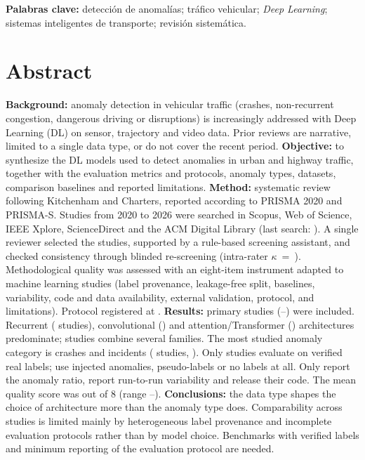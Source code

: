 \documentclass[12pt, a4paper]{article}
\begin{document}
\noindent\textbf{Palabras clave:} detecci\'{o}n de anomal\'{i}as; tr\'{a}fico vehicular; \textit{Deep Learning}; sistemas inteligentes de transporte; revisi\'{o}n sistem\'{a}tica.

\section*{Abstract}
\textbf{Background:} anomaly detection in vehicular traffic (crashes, non-recurrent congestion, dangerous driving or disruptions) is increasingly addressed with Deep Learning (DL) on sensor, trajectory and video data. Prior reviews are narrative, limited to a single data type, or do not cover the recent period.
\textbf{Objective:} to synthesize the DL models used to detect anomalies in urban and highway traffic, together with the evaluation metrics and protocols, anomaly types, datasets, comparison baselines and reported limitations.
\textbf{Method:} systematic review following Kitchenham and Charters, reported according to PRISMA 2020 and PRISMA-S. Studies from 2020 to 2026 were searched in Scopus, Web of Science, IEEE Xplore, ScienceDirect and the ACM Digital Library (last search: \FechaBusquedaEN). A single reviewer selected the studies, supported by a rule-based screening assistant, and checked consistency through blinded re-screening (intra-rater $\kappa$~=~\KappaRecribadoTA). Methodological quality was assessed with an eight-item instrument adapted to machine learning studies (label provenance, leakage-free split, baselines, variability, code and data availability, external validation, protocol, and limitations). Protocol registered at \RegistroOSF.
\textbf{Results:} \Nestudios{} primary studies (\AnioMin--\AnioMax) were included. Recurrent (\NfamRec{} studies), convolutional (\NfamConv{}) and attention/Transformer (\NfamTransf{}) architectures predominate; \Nhibrido{} studies combine several families. The most studied anomaly category is crashes and incidents (\NcatA{} studies, \PcatA). Only \NetiqVerificadas{} studies evaluate on verified real labels; \NetiqNoReales{} use injected anomalies, pseudo-labels or no labels at all. Only \Ntasa{} report the anomaly ratio, \Nvariabilidad{} report run-to-run variability and \NcodigoURL{} release their code. The mean quality score was \QAmedia{} out of 8 (range \QAmin--\QAmax).
\textbf{Conclusions:} the data type shapes the choice of architecture more than the anomaly type does. Comparability across studies is limited mainly by heterogeneous label provenance and incomplete evaluation protocols rather than by model choice. Benchmarks with verified labels and minimum reporting of the evaluation protocol are needed.
\end{document}
